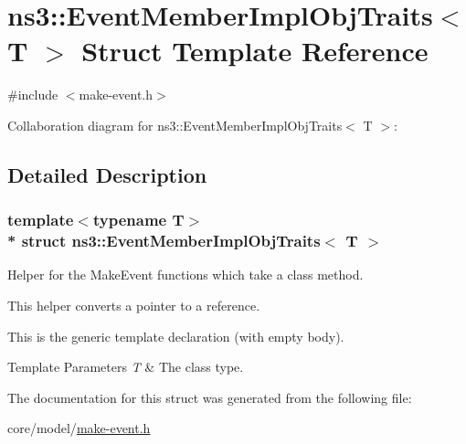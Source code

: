 \hypertarget{structns3_1_1EventMemberImplObjTraits}{}\section{ns3\+:\+:Event\+Member\+Impl\+Obj\+Traits$<$ T $>$ Struct Template Reference}
\label{structns3_1_1EventMemberImplObjTraits}


{\ttfamily \#include $<$make-\/event.\+h$>$}



Collaboration diagram for ns3\+:\+:Event\+Member\+Impl\+Obj\+Traits$<$ T $>$\+:


\subsection{Detailed Description}
\subsubsection*{template$<$typename T$>$\\*
struct ns3\+::\+Event\+Member\+Impl\+Obj\+Traits$<$ T $>$}

Helper for the Make\+Event functions which take a class method.

This helper converts a pointer to a reference.

This is the generic template declaration (with empty body).


\begin{DoxyTemplParams}{Template Parameters}
{\em T} & The class type. \\
\hline
\end{DoxyTemplParams}


The documentation for this struct was generated from the following file\+:\begin{DoxyCompactItemize}
\item 
core/model/\hyperlink{make-event_8h}{make-\/event.\+h}\end{DoxyCompactItemize}
